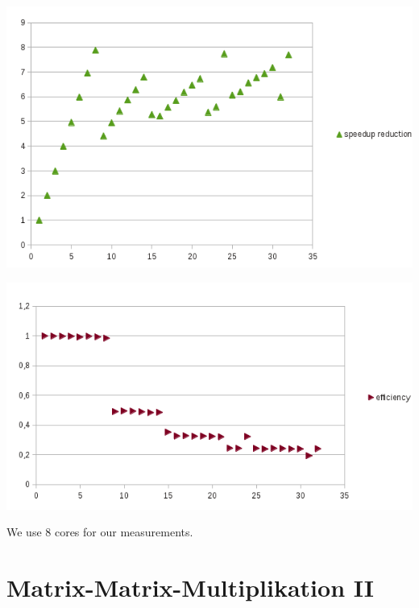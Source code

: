 \documentclass[a4paper,10pt]{article}
\begin{document}
\begin{center}
\includegraphics[]{pi_speedup.png}
\end{center}
\begin{center}
\includegraphics[]{pi_efficiency.png}
\end{center}
We use 8 cores for our measurements.

\section{Matrix-Matrix-Multiplikation II}
\end{document}
